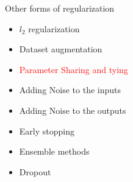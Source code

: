 \begin{frame}
\end{frame}

\begin{frame}
	\vspace{4em}
	\begin{overlayarea}{\textwidth}{\textheight}
		\begin{block}{Other forms of regularization}
			\begin{itemize}
				\item $l_2$ regularization
				\item Dataset augmentation
				\item \textcolor<2->{red}{Parameter Sharing and tying}
				\item Adding Noise to the inputs 
				\item Adding Noise to the outputs 
				\item Early stopping
				\item Ensemble methods
				\item Dropout
			\end{itemize}
		\end{block}
	\end{overlayarea}
\end{frame}
		

